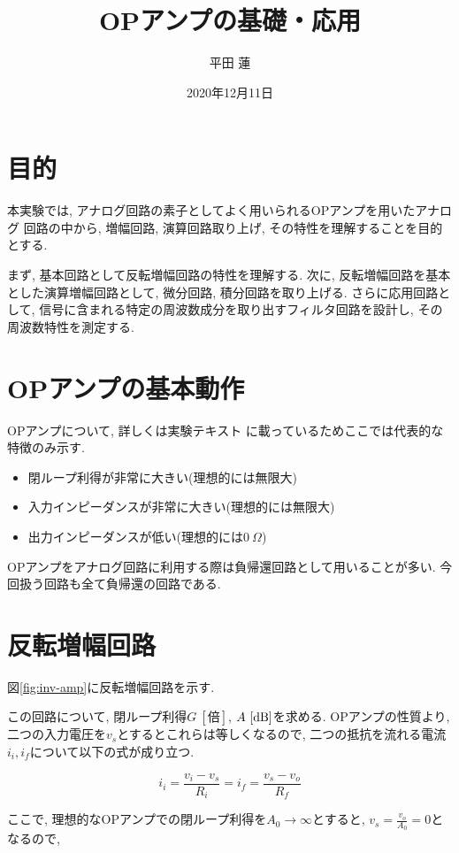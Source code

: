 \documentclass[titlepage]{jsarticle}
\title{OPアンプの基礎・応用}
\author{平田 蓮}
\date{2020年12月11日}
\begin{document}
\maketitle
\section{目的}
    本実験では, アナログ回路の素子としてよく用いられるOPアンプを用いたアナログ
    回路の中から, 増幅回路, 演算回路取り上げ, その特性を理解することを目的とする.

    まず, 基本回路として反転増幅回路の特性を理解する.
    次に, 反転増幅回路を基本とした演算増幅回路として,
    微分回路, 積分回路を取り上げる. さらに応用回路として,
    信号に含まれる特定の周波数成分を取り出すフィルタ回路を設計し,
    その周波数特性を測定する.

\section{OPアンプの基本動作}
    OPアンプについて, 詳しくは実験テキスト\cite{text}
    に載っているためここでは代表的な特徴のみ示す.

    \begin{itemize}
        \item 閉ループ利得が非常に大きい(理想的には無限大)
        \item 入力インピーダンスが非常に大きい(理想的には無限大)
        \item 出力インピーダンスが低い(理想的には$0 \ \Omega$)
    \end{itemize}

    OPアンプをアナログ回路に利用する際は負帰還回路として用いることが多い.
    今回扱う回路も全て負帰還の回路である.

\section{反転増幅回路}
    図\ref{fig:inv-amp}に反転増幅回路を示す.

    この回路について, 閉ループ利得$G \ [倍]$, $A \ [\rm{dB}]$を求める.
    OPアンプの性質より, 二つの入力電圧を$v_s$とするとこれらは等しくなるので,
    二つの抵抗を流れる電流$i_i, i_f$について以下の式が成り立つ.

    \begin{equation*}
        i_i = \frac{v_i - v_s}{R_i} = i_f = \frac{v_s - v_o}{R_f}
    \end{equation*}

    ここで, 理想的なOPアンプでの閉ループ利得を$A_0 \rightarrow \infty$とすると,
    $\displaystyle v_s = \frac{v_o}{A_0} = 0$となるので,
\end{document}
